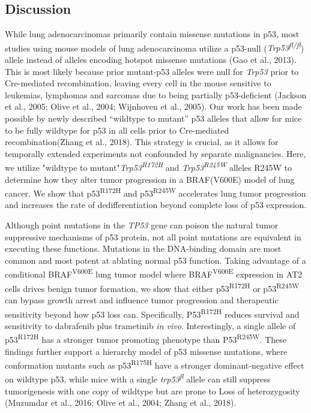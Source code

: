 \hypertarget{discussion-1}{%
\subsection{Discussion}\label{discussion-1}}

While lung adenocarcinomas primarily contain missense mutations in p53, most studies using mouse models of lung adenocarcinoma utilize a p53-null (\emph{Trp53\textsuperscript{fl/fl}}) allele instead of alleles encoding hotspot missense mutations (Gao et al., 2013). This is most likely because prior mutant-p53 alleles were null for \emph{Trp53} prior to Cre-mediated recombination, leaving every cell in the mouse sensitive to leukemias, lymphomas and sarcomas due to being partially p53-deficient (Jackson et al., 2005; Olive et al., 2004; Wijnhoven et al., 2005). Our work has been made possible by newly described ``wildtype to mutant'' p53 alleles that allow for mice to be fully wildtype for p53 in all cells prior to Cre-mediated recombination(Zhang et al., 2018). This strategy is crucial, as it allows for temporally extended experiments not confounded by separate malignancies. Here, we utilize "wildtype to mutant"\emph{Trp53\textsuperscript{R172H}} and \emph{Trp53\textsuperscript{R245W}} alleles R245W to determine how they alter tumor progression in a BRAF(V600E) model of lung cancer. We show that p53\textsuperscript{R172H} and p53\textsuperscript{R245W} accelerates lung tumor progression and increases the rate of dedifferentiation beyond complete loss of p53 expression.

Although point mutations in the \emph{TP53} gene can poison the natural tumor suppressive mechanisms of p53 protein, not all point mutations are equivalent in executing these functions. Mutations in the DNA-binding domain are most common and most potent at ablating normal p53 function. Taking advantage of a conditional BRAF\textsuperscript{V600E} lung tumor model where BRAF\textsuperscript{V600E} expression in AT2 cells drives benign tumor formation, we show that either p53\textsuperscript{R172H} or p53\textsuperscript{R245W} can bypass growth arrest and influence tumor progression and therapeutic sensitivity beyond how p53 loss can. Specifically, P53\textsuperscript{R172H} reduces survival and sensitivity to dabrafenib plus trametinib \emph{in vivo}. Interestingly, a single allele of p53\textsuperscript{R172H} has a stronger tumor promoting phenotype than P53\textsuperscript{R245W}. These findings further support a hierarchy model of p53 missense mutations, where conformation mutants such as p53\textsuperscript{R175H} have a stronger dominant-negative effect on wildtype p53, while mice with a single \emph{trp53\textsuperscript{fl}} allele can still suppress tumorigenesis with one copy of wildtype but are prone to Loss of heterozygosity (Muzumdar et al., 2016; Olive et al., 2004; Zhang et al., 2018).

